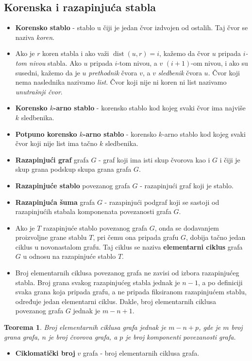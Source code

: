 \documentclass[a4paper,12pt,twoside]{report}
\newtheorem{theorem}{Teorema}[section]
\numberwithin{algorithm}{section}
\begin{document}
\subsection{Korenska i razapinjuća stabla}
\begin{itemize}
    \item \textbf{Korensko stablo} - stablo u čiji je jedan čvor izdvojen od ostalih. Taj čvor se naziva \textit{koren}.
    \item Ako je $r$ koren stabla i ako važi $\operatorname{dist}(u, r) = i$, kažemo da čvor $u$ pripada \textit{$i$-tom nivou} stabla. Ako $u$ pripada $i$-tom nivou, a $v$ $(i + 1)$-om nivou, i ako su susedni, kažemo da je $u$ \textit{prethodnik} čvora $v$, a $v$ \textit{sledbenik} čvora $u$. Čvor koji nema naslednika nazivamo \textit{list}. Čvor koji nije ni koren ni list nazivamo \textit{unutrašnji čvor}.
    \item \textbf{Korensko $k$-arno stablo} - korensko stablo kod kojeg svaki čvor ima najviše $k$ sledbenika.
    \item \textbf{Potpuno korensko $k$-arno stablo} - korensko $k$-arno stablo kod kojeg svaki čvor koji nije list ima tačno $k$ sledbenika.
    \item \textbf{Razapinjući graf} grafa $G$ - graf koji ima isti skup čvorova kao i $G$ i čiji je skup grana podskup skupa grana grafa $G$. 
    \item \textbf{Razapinjuće stablo} povezanog grafa $G$ - razapinjući graf koji je stablo.
    \item \textbf{Razapinjuća šuma} grafa $G$ - razapinjući podgraf koji se sastoji od razapinjućih stabala komponenata povezanosti grafa $G$.
    \item Ako je $T$ razapinjuće stablo povezanog grafa $G$, onda se dodavanjem proizvoljne grane stablu $T$, pri čemu ona pripada grafu $G$, dobija tačno jedan ciklus u novonastalom grafu. Taj ciklus se naziva \textbf{elementarni ciklus} grafa $G$ u odnosu na razapinjuće stablo $T$.
    \item Broj elementarnih ciklusa povezanog grafa ne zavisi od izbora razapinjućeg stabla. Broj grana svakog razapinjućeg stabla jednak je $n - 1$, a po definiciji svaka grana koja pripada grafu, a ne pripada fiksiranom razapinjućem stablu, određuje jedan elementarni ciklus. Dakle, broj elementarnih ciklusa povezanog grafa $G$ jednak je $m - n + 1$.
\end{itemize}

\begin{theorem}
    Broj elementarnih ciklusa grafa jednak je $m - n + p$, gde je $m$ broj grana grafa, $n$ je broj čvorova grafa, a $p$ je broj komponenti povezanosti grafa.
\end{theorem}
\begin{itemize}
    \item \textbf{Ciklomatički broj} $v$ grafa - broj elementarnih ciklusa grafa.
\end{itemize}
\end{document}
